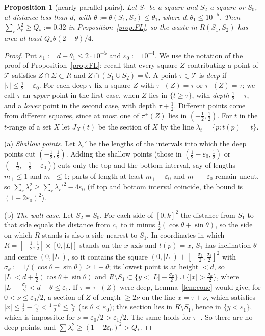 \documentclass[11pt]{amsart}
\newtheorem{proposition}[theorem]{Proposition}
\theoremstyle{definition}
\theoremstyle{remark}
\begin{document}
\begin{proposition}[nearly parallel pairs]\label{prop:FLpar}
Let $S_1$ be a square and $S_2$ a square or $S_0$, at distance less than $d$, with $\theta:=\theta(S_1,S_2)\le\theta_1$, where
$d,\theta_1\le10^{-5}$. Then $\sum_r\lambda_r^2\ge Q_*:=0.32$ in Proposition~\ref{prop:FL}, so the waste in $R(S_1,S_2)$ has
area at least $Q_*\theta(2-\theta)/4$.
\end{proposition}

\begin{proof}
Put $\varepsilon_1:=d+\theta_1\le2\cdot10^{-5}$ and $\varepsilon_0:=10^{-4}$. We use the notation of the proof of
Proposition~\ref{prop:FL}; recall that every square $Z$ contributing a point of $\mathcal T$ satisfies $Z\cap\Sigma\subset R$ and
$Z\cap(S_1\cup S_2)=\emptyset$. A point $\tau\in\mathcal T$ is \emph{deep} if $|\tau|\le\frac12-\varepsilon_0$. For each deep $\tau$
fix a square $Z$ with $\tau^-(Z)=\tau$ or $\tau^+(Z)=\tau$; we call $\tau$ an \emph{upper} point in the first case, when $Z$ lies in
$\{t\ge\tau\}$, with \emph{depth} $\frac12-\tau$, and a \emph{lower} point in the second case, with depth $\tau+\frac12$.
Different points come from different squares, since at most one of $\tau^\pm(Z)$ lies in $(-\frac12,\frac12)$. For $t$ in the
$t$-range of a set $X$ let $J_X(t)$ be the section of $X$ by the line $\lambda_t=\{p:t(p)=t\}$.

(a) \emph{Shallow points.} Let $\lambda_r'$ be the lengths of the intervals into which the deep points cut $(-\frac12,\frac12)$.
Adding the shallow points (those in $(\frac12-\varepsilon_0,\frac12)$ or $(-\frac12,-\frac12+\varepsilon_0)$) cuts only the top and
the bottom interval, say of lengths $m_+\le1$ and $m_-\le1$; parts of length at least $m_+-\varepsilon_0$ and $m_--\varepsilon_0$ remain
uncut, so $\sum_r\lambda_r^2\ge\sum_r\lambda_r'^2-4\varepsilon_0$ (if top and bottom interval coincide, the bound is
$(1-2\varepsilon_0)^2$).

(b) \emph{The wall case.} Let $S_2=S_0$. For each side of $[0,k]^2$ the distance from $S_1$ to that side equals the distance from
$c_1$ to it minus $\frac12(\cos\theta+\sin\theta)$, so the side on which $R$ stands is also a side nearest to $S_1$. In coordinates in
which $R=[-\frac12,\frac12]\times[0,|L|]$ stands on the $x$-axis and $t(p)=x$, $S_1$ has inclination $\theta$ and centre $(0,|L|)$, so it
contains the square $(0,|L|)+[-\frac{\sigma_\theta}2,\frac{\sigma_\theta}2]^2$ with $\sigma_\theta:=1/(\cos\theta+\sin\theta)\ge1-\theta$; its lowest point is
at height $<d$, so $|L|<d+\frac12(\cos\theta+\sin\theta)$ and $R\setminus S_1\subset\{y<|L|-\frac{\sigma_\theta}2\}\cup\{|x|>\frac{\sigma_\theta}2\}$, where
$|L|-\frac{\sigma_\theta}2<d+\theta\le\varepsilon_1$. If $\tau=\tau^-(Z)$ were deep, Lemma~\ref{lem:cone} would give, for $0<\nu\le\varepsilon_0/2$, a
section of $Z$ of length $\ge2\nu$ on the line $x=\tau+\nu$, which satisfies $|x|\le\frac12-\frac{\varepsilon_0}2<\frac{1-\theta}2\le\frac{\sigma_\theta}2$ (as $\theta<\varepsilon_0$); this section lies in $R\setminus S_1$,
hence in $\{y<\varepsilon_1\}$, which is impossible for $\nu=\varepsilon_0/2>\varepsilon_1/2$. The same holds for $\tau^+$. So there are no deep
points, and $\sum\lambda_r^2\ge(1-2\varepsilon_0)^2>Q_*$.


\end{proof}
\end{document}
